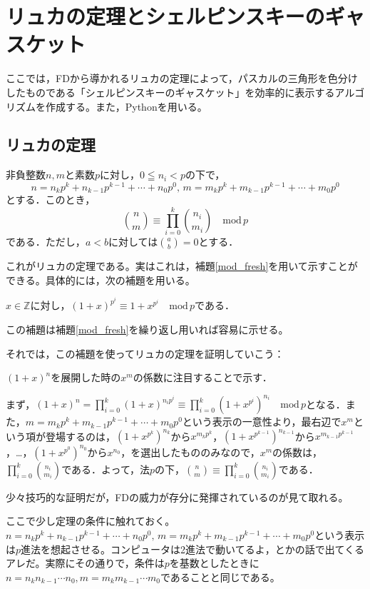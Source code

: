\section{リュカの定理とシェルピンスキーのギャスケット}

ここでは，\textsf{FD}から導かれるリュカの定理によって，パスカルの三角形を色分けしたものである「シェルピンスキーのギャスケット」を効率的に表示するアルゴリズムを作成する。また，Pythonを用いる。

\subsection{リュカの定理}
\begin{thm}[Lucas]
    非負整数$n,m$と素数$p$に対し，$0 \leqq n_i< p$の下で，\[
    n=n_kp^k+n_{k-1}p^{k-1}+\cdots+n_0p^0,\,m=m_kp^k+m_{k-1}p^{k-1}+\cdots+m_0p^0
    \]
    とする．このとき，\[
    \binom{n}{m}\equiv \prod_{i=0}^{k} \binom{n_i}{m_i} \quad \mathrm{mod}\, p
    \]
    である．ただし，$a<b$に対しては$\binom{a}{b}=0$とする．
\end{thm}

これがリュカの定理である。実はこれは，補題\ref{mod_fresh}を用いて示すことができる。具体的には，次の補題を用いる。
\begin{lemma}[\textsf{FD}]\label{mod_fresh_sec}
    $x\in\mathbb{Z}$に対し，$(1+x)^{p^i}\equiv 1+x^{p^i} \quad \mathrm{mod}\,p$である．
\end{lemma}

この補題は補題\ref{mod_fresh}を繰り返し用いれば容易に示せる。

それでは，この補題を使ってリュカの定理を証明していこう：
\begin{prf}
    $(1+x)^n$を展開した時の$x^m$の係数に注目することで示す．

    まず，$(1+x)^n=\prod_{i=0}^{k}(1+x)^{n_ip^i}\equiv\prod_{i=0}^{k}(1+x^{p^i})^{n_i}\quad \mathrm{mod}\,p$となる．また，$m=m_kp^k+m_{k-1}p^{k-1}+\cdots+m_0p^0$という表示の一意性より，最右辺で$x^m$という項が登場するのは，$(1+x^{p^k})^{n_k}$から$x^{m_kp^k}$，$(1+x^{p^{k-1}})^{n_{k-1}}$から$x^{m_{k-1}p^{k-1}}$，\dots，$(1+x^{p^0})^{n_0}$から$x^{n_0}$，を選出したもののみなので，$x^m$の係数は，$\prod_{i=0}^{k}\binom{n_i}{m_i}$である．よって，法$p$の下，$\binom{n}{m}\equiv\prod_{i=0}^{k}\binom{n_i}{m_i}$である．
\end{prf}

少々技巧的な証明だが，\textsf{FD}の威力が存分に発揮されているのが見て取れる。

ここで少し定理の条件に触れておく。$n=n_kp^k+n_{k-1}p^{k-1}+\cdots+n_0p^0,\,m=m_kp^k+m_{k-1}p^{k-1}+\cdots+m_0p^0$という表示は$p$進法を想起させる。コンピュータは2進法で動いてるよ，とかの話で出てくるアレだ。実際にその通りで，条件は$p$を基数としたときに$n=n_kn_{k-1}\cdots n_0,m=m_km_{k-1}\cdots m_0$であることと同じである。

